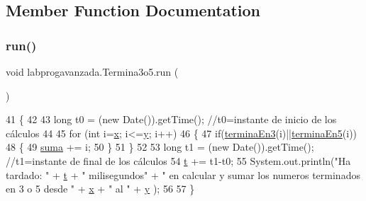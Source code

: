 \subsection{Member Function Documentation}
\mbox{\label{classlabprogavanzada_1_1_termina3o5_a356cebcd0a53ff65896f0da242121f6a}} 
\subsubsection{\texorpdfstring{run()}{run()}}
{\footnotesize\ttfamily void labprogavanzada.\+Termina3o5.\+run (\begin{DoxyParamCaption}{ }\end{DoxyParamCaption})\hspace{0.3cm}{\ttfamily [inline]}}


\begin{DoxyCode}
41                      \{
42         
43         \textcolor{keywordtype}{long} t0 = (\textcolor{keyword}{new} Date()).getTime(); \textcolor{comment}{//t0=instante de inicio de los cálculos}
44         
45         \textcolor{keywordflow}{for} (\textcolor{keywordtype}{int} i=\mbox{\hyperlink{classlabprogavanzada_1_1_termina3o5_a895542b64115c1476a50d623aa2b40dc}{x}}; i<=\mbox{\hyperlink{classlabprogavanzada_1_1_termina3o5_a3e66f695fc1d536c80f6c6e5404b5715}{y}}; i++)
46         \{
47             \textcolor{keywordflow}{if}(\mbox{\hyperlink{classlabprogavanzada_1_1_termina3o5_a2c1157a071b19562e9740dbac68b443d}{terminaEn3}}(i)||\mbox{\hyperlink{classlabprogavanzada_1_1_termina3o5_aea7ebcb9dea337e83e865d71e61a525c}{terminaEn5}}(i))
48             \{
49                 \mbox{\hyperlink{namespacesuma}{suma}} += i;
50             \}
51         \}
52         
53         \textcolor{keywordtype}{long} t1 = (\textcolor{keyword}{new} Date()).getTime(); \textcolor{comment}{//t1=instante de final de los cálculos}
54         \mbox{\hyperlink{classlabprogavanzada_1_1_termina3o5_a3004d9e03519fed1c39d15aaf27925c4}{t}} += t1-t0;
55         System.out.println(\textcolor{stringliteral}{"Ha tardado: "} + \mbox{\hyperlink{classlabprogavanzada_1_1_termina3o5_a3004d9e03519fed1c39d15aaf27925c4}{t}} + \textcolor{stringliteral}{" milisegundos"} + \textcolor{stringliteral}{" en calcular y sumar los numeros
       terminados en 3 o 5 desde "} + \mbox{\hyperlink{classlabprogavanzada_1_1_termina3o5_a895542b64115c1476a50d623aa2b40dc}{x}} + \textcolor{stringliteral}{" al "} + \mbox{\hyperlink{classlabprogavanzada_1_1_termina3o5_a3e66f695fc1d536c80f6c6e5404b5715}{y}} );
56            
57     \}
\end{DoxyCode}
\mbox{\label{classlabprogavanzada_1_1_termina3o5_a731e9939fe2b72fb38c1cd604244e4f8}} 

